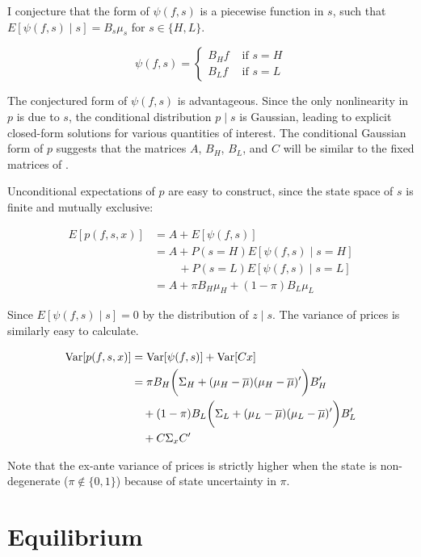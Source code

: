 \documentclass{article}
\begin{document}
I conjecture that the form of $\psi(f, s)$ is a piecewise function in $s$, such that $E[\psi(f, s) \mid s] = B_s \mu_s$ for $s \in \{H, L\}$.

$$
\psi(f, s) = \begin{cases}
    B_H f & \text{ if } s=H \\
    B_L f & \text{ if } s=L
\end{cases}
$$

\noindent The conjectured form of $\psi(f, s)$ is advantageous. Since the only nonlinearity in $p$ is due to $s$, the conditional distribution $p \mid s$ is Gaussian, leading to explicit closed-form solutions for various quantities of interest. The conditional Gaussian form of $p$ suggests that the matrices $A$, $B_H$, $B_L$, and $C$ will be similar to the fixed matrices of \textcite{kacperczyk_rational_2016}.

Unconditional expectations of $p$ are easy to construct, since the state space of $s$ is finite and mutually exclusive:

\begin{align}
    E[p(f, s, x)] &= A + E[\psi(f,s)] \nonumber\\
    &= A + P(s=H) E[\psi(f,s) \mid s = H] \nonumber\\
    &\qquad\, + P(s=L) E[\psi(f,s) \mid s = L] \nonumber\\
    &= A + \pi B_H \mu_H + (1-\pi) B_L \mu_L
\end{align}

\noindent Since $E[\psi(f,s) \mid s]=0$ by the distribution of $z \mid s$. The variance of prices is similarly easy to calculate.

\begin{align}
    \text{Var}[p(f, s, x)] &= \text{Var}[\psi(f, s)] + \text{Var}[C x] \\
                     &= \pi  B_H \bigg(\Sigma_H + (\mu_H - \overline{\mu})(\mu_H - \overline{\mu})' \bigg) B_H' \\
                     &\quad+ (1-\pi) B_L \bigg(\Sigma_L + (\mu_L - \overline{\mu})(\mu_L - \overline{\mu})' \bigg) B_L' \\
                     &\quad+ C \Sigma_x C'
\end{align}

Note that the ex-ante variance of prices is strictly higher when the state is non-degenerate ($\pi \notin \{0, 1\}$) because of state uncertainty in $\pi$.

\section{Equilibrium}
\end{document}
